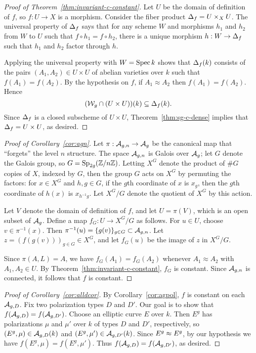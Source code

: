 \documentclass{amsart}
\begin{document}
\begin{proof}[Proof of Theorem~\ref{thm:invariant-c-constant}]
  Let $U$ be the domain of definition of $f$, so $f: U \to X$ is a morphism. Consider the fiber product $\Delta_f = U \times_X U$.
  The universal property of $\Delta_f$ says that for any scheme $W$ and morphisms $h_1$ and $h_2$ from $W$ to $U$ such that $f \circ h_1 = f \circ h_2$, there is a unique morphism $h: W \to \Delta_f$ such that $h_1$ and $h_2$ factor through $h$.

  Applying the universal property with $W = \operatorname{Spec} k$ shows that $\Delta_f(k)$ consists of the pairs $(A_1,A_2) \in U \times U$ of abelian varieties over $k$ such that $f(A_1) = f(A_2)$.
  By the hypothesis on $f$, if $A_1 \approx A_2$ then $f(A_1) = f(A_2)$. Hence 
  $$(\mathcal{W}_g \cap (U \times U))(k) \subseteq \Delta_f(k).$$
  Since $\Delta_f$ is a closed subscheme of $U \times U$, Theorem~\ref{thm:sg-c-dense} implies that $\Delta_f = U \times U$, as desired.
\end{proof}

\begin{proof}[Proof of Corollary~\ref{cor:agn}]
  Let $\pi: \mathcal{A}_{g,n} \to \mathcal{A}_g$ be the canonical map that ``forgets'' the level $n$ structure. The space $\mathcal{A}_{g,n}$ is Galois over $\mathcal{A}_g$; let $G$ denote the Galois group, so %
  $G = \operatorname{Sp}_{2g}(\mathbb{Z}/n\mathbb{Z})$. Letting $X^G$ denote the product of $\# G$ copies of $X$, indexed by $G$, then the group $G$ acts on $X^G$ by permuting the factors: for $x \in X^G$ and $h,g \in G$, if the $g$th coordinate of $x$ is $x_g$, then the $g$th coordinate of $h(x)$ is $x_{h^{-1}g}$.
  Let $X^G/G$ denote the quotient of $X^G$ by this action.

  Let $V$ denote the domain of definition of $f$, and let $U = \pi(V)$, which is an open subset of $\mathcal{A}_g$. Define a map $f_G: U \to X^G/G$ as follows. For $u \in U$, choose  $v \in \pi^{-1}(x)$. Then $\pi^{-1}(u) = \{g(v)\}_{g \in G} \subset \mathcal{A}_{g,n}$. Let $z = (f(g(v)))_{g \in G} \in X^G$, and let $f_G(u)$ be the image of $z$ in $X^G/G$.

  Since $\pi(A,L) = A$, we have $f_G(A_1) = f_G(A_2)$ whenever $A_1 \approx A_2$ with $A_1,A_2 \in U$. By Theorem~\ref{thm:invariant-c-constant}, $f_G$ is constant. Since $\mathcal{A}_{g,n}$ is connected, it follows that $f$ is constant.
\end{proof}

\begin{proof}[Proof of Corollary~\ref{cor:alldcor}]
  By Corollary~\ref{cor:agpol}, $f$ is constant on each $\mathcal{A}_{g,{D}}$.
 Fix two polarization types $D$ and $D'$. Our goal is to show that $f(\mathcal{A}_{g,{D}}) = f(\mathcal{A}_{g,{D'}})$. Choose an elliptic curve $E$ over $k$. Then $E^g$ has polarizations $\mu$ and $\mu'$ over $k$ of types $D$ and $D'$, respectively, so $(E^g, \mu) \in \mathcal{A}_{g,{D}}(k)$ and $(E^g,\mu') \in \mathcal{A}_{g,{D'}}(k)$. Since $E^g \approx E^g$, by our hypothesis we have $f(E^g, \mu) = f(E^g, \mu')$. Thus $f(\mathcal{A}_{g,{D}}) = f(\mathcal{A}_{g,{D'}})$, as desired.
\end{proof}
\end{document}
